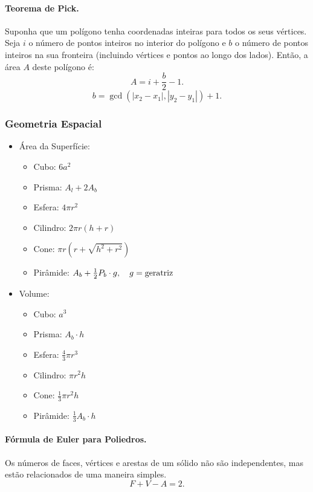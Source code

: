 \paragraph{Teorema de Pick.} Suponha que um polígono tenha coordenadas inteiras para todos os seus vértices. Seja $i$ o número de pontos inteiros no interior do polígono e $b$ o número de pontos inteiros na sua fronteira (incluindo vértices e pontos ao longo dos lados). Então, a área $A$ deste polígono é:
$$A = i + \frac{b}{2} -1.$$
$$b = \gcd(|x_2-x_1|,|y_2-y_1|)+1.$$

\subsubsection{Geometria Espacial}

\begin{multicols}{2}
	\begin{itemize}
		\item Área da Superfície:
		\begin{itemize}
			\item Cubo: $6a^2$
			\item Prisma: $A_l + 2A_b$
			\item Esfera: $4\pi r^2$
			\item Cilindro: $2\pi r(h+r)$
			\item Cone: $\pi r(r+\sqrt{h^2+r^2})$
			\item Pirâmide: $A_b+\frac{1}{2}P_b \cdot g, \quad g=\textnormal{geratriz}$
		\end{itemize}

		\item Volume:
		\begin{itemize}
			\item Cubo: $a^3$
			\item Prisma: $A_b\cdot h$
			\item Esfera: $\frac{4}{3} \pi r^3$
			\item Cilindro: $\pi r^2h$
			\item Cone: $\frac{1}{3} \pi r^2 h$
			\item Pirâmide: $\frac{1}{3} A_b\cdot h$
		\end{itemize}

	\end{itemize}
\end{multicols}

\paragraph{Fórmula de Euler para Poliedros.} Os números de faces, vértices e arestas de um sólido não são independentes, mas estão relacionados de uma maneira simples.
$$F + V - A = 2.$$

